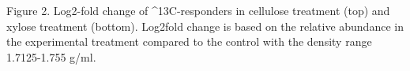 Figure 2. Log2-fold change of ^{13}C-responders in cellulose treatment (top) and xylose treatment (bottom). Log2fold change is based on the relative abundance in the experimental treatment compared to the control with the density range 1.7125-1.755 g/ml.
